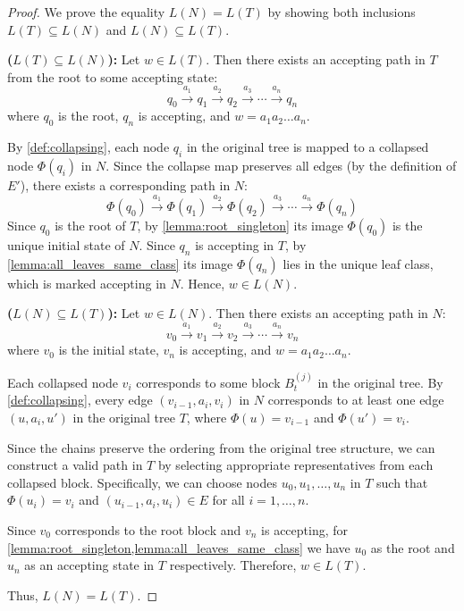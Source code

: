 \begin{proof}
    We prove the equality $L(N) = L(T)$ by showing both inclusions $L(T) \subseteq L(N)$ and $L(N) \subseteq L(T)$.

    \textbf{($L(T) \subseteq L(N)$):} Let $w \in L(T)$. Then there exists an accepting path in $T$ from the root to some accepting state:
    \[
        q_0 \xrightarrow{a_1} q_1 \xrightarrow{a_2} q_2 \xrightarrow{a_3} \cdots \xrightarrow{a_n} q_n
    \]
    where $q_0$ is the root, $q_n$ is accepting, and $w = a_1a_2\ldots a_n$.

    By \cref{def:collapsing}, each node $q_i$ in the original tree is mapped to a collapsed node $\Phi(q_i)$ in $N$. Since the collapse map preserves all edges (by the definition of $E'$), there exists a corresponding path in $N$:
    \[
        \Phi(q_0) \xrightarrow{a_1} \Phi(q_1) \xrightarrow{a_2} \Phi(q_2) \xrightarrow{a_3} \cdots \xrightarrow{a_n} \Phi(q_n)
    \]
    Since $q_0$ is the root of $T$, by \cref{lemma:root_singleton} its image $\Phi(q_0)$ is the unique initial state of $N$. Since $q_n$ is accepting in $T$, by \cref{lemma:all_leaves_same_class} its image $\Phi(q_n)$ lies in the unique leaf class, which is marked accepting in $N$. Hence, $w \in L(N)$.

    \textbf{($L(N) \subseteq L(T)$):} Let $w \in L(N)$. Then there exists an accepting path in $N$:
    \[
        v_0 \xrightarrow{a_1} v_1 \xrightarrow{a_2} v_2 \xrightarrow{a_3} \cdots \xrightarrow{a_n} v_n
    \]
    where $v_0$ is the initial state, $v_n$ is accepting, and $w = a_1a_2\ldots a_n$.

    Each collapsed node $v_i$ corresponds to some block $B_t^{(j)}$ in the original tree. By \cref{def:collapsing}, every edge $(v_{i-1}, a_i, v_i)$ in $N$ corresponds to at least one edge $(u, a_i, u')$ in the original tree $T$, where $\Phi(u) = v_{i-1}$ and $\Phi(u') = v_i$.

    Since the chains preserve the ordering from the original tree structure, we can construct a valid path in $T$ by selecting appropriate representatives from each collapsed block. Specifically, we can choose nodes $u_0, u_1, \ldots, u_n$ in $T$ such that $\Phi(u_i) = v_i$ and $(u_{i-1}, a_i, u_i) \in E$ for all $i = 1, \ldots, n$.

    Since $v_0$ corresponds to the root block and $v_n$ is accepting, for \cref{lemma:root_singleton,lemma:all_leaves_same_class} we have $u_0$ as the root and $u_n$ as an accepting state in $T$ respectively. Therefore, $w \in L(T)$.

    Thus, $L(N) = L(T)$.
\end{proof}

